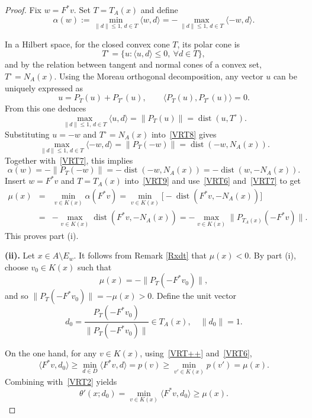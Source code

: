 \documentclass[11pt]{article}
\begin{document}
\begin{proof}
	Fix $w = F^*v$. Set $T = T_A(x)$ and define
	\begin{equation}\label{VRT7}
		\alpha(w) := \min_{\|d\|\le 1,\, d\in T} \langle w, d\rangle = -\max_{\|d\|\le 1,\, d\in T} \langle -w, d\rangle.
	\end{equation}
	
	In a Hilbert space, for the closed convex cone $T$, its polar cone is
	\[
	T^\circ = \{ u : \langle u, d\rangle \le 0,\ \forall d\in T \},
	\]
	and by the relation between tangent and normal cones of a convex set, $T^\circ = N_A(x)$. Using the Moreau orthogonal decomposition, any vector $u$ can be uniquely expressed as
	\[
	u = P_T(u) + P_{T^\circ}(u), \qquad \langle P_T(u), P_{T^\circ}(u) \rangle = 0.
	\]
	From this one deduces
	\begin{equation}\label{VRT8}
		\max_{\|d\|\le 1,\, d\in T} \langle u, d\rangle = \|P_T(u)\| = \operatorname{dist}(u, T^\circ).
	\end{equation}
	Substituting $u = -w$ and $T^\circ = N_A(x)$ into~\eqref{VRT8} gives
	\[
	\max_{\|d\|\le 1,\, d\in T} \langle -w, d\rangle = \|P_T(-w)\| = \operatorname{dist}(-w, N_A(x)).
	\]
	Together with~\eqref{VRT7}, this implies
	\begin{equation}\label{VRT9}
		\alpha(w) = -\|P_T(-w)\| = -\operatorname{dist}(-w, N_A(x)) = -\operatorname{dist}(w, -N_A(x)).
	\end{equation}
	Insert $w = F^*v$ and $T = T_A(x)$ into~\eqref{VRT9} and use~\eqref{VRT6} and~\eqref{VRT7} to get
	\begin{eqnarray}\label{VRT10}
		\mu(x) &=& \min_{v\in K(x)} \alpha(F^*v)
		= \min_{v\in K(x)} \bigl[-\operatorname{dist}(F^*v, -N_A(x))\bigr] \nonumber\\ 
		&=& -\max_{v\in K(x)} \operatorname{dist}(F^*v, -N_A(x)) = -\max_{v\in K(x)}\bigl\|P_{T_A(x)}(-F^*v)\bigr\|.
	\end{eqnarray}
 This proves part (i).
	
 
	
	\medskip
	\noindent\textbf{(ii).} Let $x\in A\setminus E_w$.  It follows from  Remark   \ref{Rxdt}    that $\mu(x) < 0$. By part (i), choose $v_0\in K(x)$ such that
	\[
	\mu(x) = -\|P_T(-F^*v_0)\|,
	\]
	and so $\|P_T(-F^*v_0)\| = -\mu(x) > 0$. Define the unit vector
	\[
	d_0 = \frac{P_T(-F^*v_0)}{\|P_T(-F^*v_0)\|} \in T_A(x), \quad \|d_0\| = 1.
	\]
	
	On the one hand, for any $v\in K(x)$, using~\eqref{VRT++} and~\eqref{VRT6},
	\[
	\langle F^*v, d_0\rangle \ge \min_{d\in D} \langle F^*v, d\rangle = p(v) \ge \min_{v'\in K(x)} p(v') = \mu(x).
	\]
	Combining with~\eqref{VRT2} yields
	\begin{equation}\label{VRT11}
		\theta'(x;d_0) = \min_{v\in K(x)} \langle F^*v, d_0\rangle \ge \mu(x).
	\end{equation}
	

\end{proof}
\end{document}
